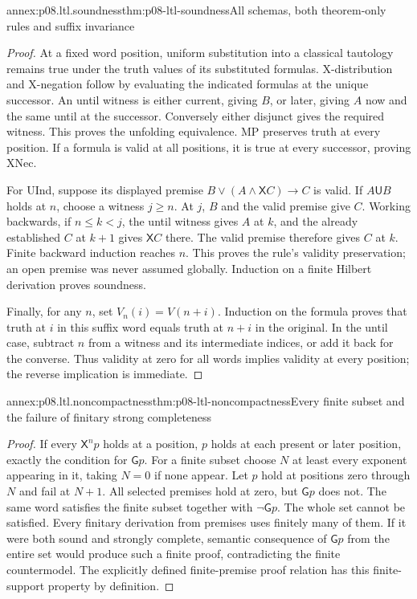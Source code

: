 \begin{annexitem}{annex:p08.ltl.soundness}{thm:p08-ltl-soundness}{All schemas, both theorem-only rules and suffix invariance}
\begin{proof}
At a fixed word position, uniform substitution into a classical
tautology remains true under the truth values of its substituted
formulas. X-distribution and X-negation follow by evaluating the
indicated formulas at the unique successor. An until witness is
either current, giving \(B\), or later, giving \(A\) now and
the same until at the successor. Conversely either disjunct gives
the required witness. This proves the unfolding equivalence.
MP preserves truth at every position. If a formula is valid at
all positions, it is true at every successor, proving XNec.

For UInd, suppose its displayed premise
\(B\lor(A\land\mathsf XC)\to C\) is valid. If
\(A\mathbin{\mathsf U}B\) holds at \(n\), choose a witness
\(j\geq n\). At \(j\), \(B\) and the valid premise give
\(C\). Working backwards, if \(n\leq k<j\), the until
witness gives \(A\) at \(k\), and the already established
\(C\) at \(k+1\) gives \(\mathsf XC\) there. The valid
premise therefore gives \(C\) at \(k\). Finite backward
induction reaches \(n\). This proves the rule's validity
preservation; an open premise was never assumed globally.
Induction on a finite Hilbert derivation proves soundness.

Finally, for any \(n\), set \(V_n(i)=V(n+i)\). Induction on
the formula proves that truth at \(i\) in this suffix word equals
truth at \(n+i\) in the original. In the until case, subtract
\(n\) from a witness and its intermediate indices, or add it
back for the converse. Thus validity at zero for all words implies
validity at every position; the reverse implication is immediate.
\end{proof}
\end{annexitem}

\begin{annexitem}{annex:p08.ltl.noncompactness}{thm:p08-ltl-noncompactness}{Every finite subset and the failure of finitary strong completeness}
\begin{proof}
If every \(\mathsf X^n p\) holds at a position, \(p\) holds
at each present or later position, exactly the condition for
\(\mathsf Gp\). For a finite subset choose \(N\) at least
every exponent appearing in it, taking \(N=0\) if none appear.
Let \(p\) hold at positions zero through \(N\) and fail at
\(N+1\). All selected premises hold at zero, but \(\mathsf Gp\)
does not. The same word satisfies the finite subset together with
\(\neg\mathsf Gp\). The whole set cannot be satisfied.
Every finitary derivation from premises uses finitely many of them.
If it were both sound and strongly complete, semantic consequence
of \(\mathsf Gp\) from the entire set would produce such a
finite proof, contradicting the finite countermodel. The explicitly
defined finite-premise proof relation has this finite-support
property by definition.
\end{proof}
\end{annexitem}

